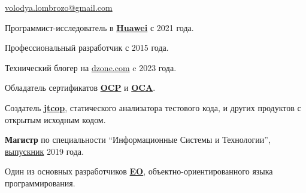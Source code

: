 \documentclass{vl}
\begin{document}
    \vlPrintPhoto{}

    {\bfseries\Large {}}\newline
    \href{mailto:volodya.lombrozo@gmail.com}{volodya.lombrozo@gmail.com}

    \vspace{1em}

    Программист-исследователь в \textbf{\href{https://www.huawei.com}{Huawei}} с 2021 года.

    Профессиональный разработчик с 2015 года.

    Технический блогер на \href{https://dzone.com/users/4993224/volodya-lombrozo.html}{dzone.com} c 2023 года.

    Обладатель сертификатов
    \textbf{\href{https://catalog-education.oracle.com/pls/certview/sharebadge?id=87F6A2FE819A5A5AF4120A05900AB28A461EE9A3EE9FBFA02721FADAEB3BCE19}{OCP}}%
    и
    \textbf{\href{https://www.credly.com/badges/e2d9ddda-20dc-433d-8ab7-18548fd0fd8f/public_url}{OCA}}.

    Создатель \textbf{\href{https://github.com/volodya-lombrozo/jtcop}{jtcop}}, статического анализатора тестового кода,
    и других продуктов с открытым исходным кодом.


    \textbf{Магистр} по специальности ``Информационные Системы и Технологии'',
    \href{https://en.wikipedia.org/wiki/Saint_Petersburg_Electrotechnical_University}{выпускник} 2019 года.

    Один из основных разработчиков \textbf{\href{https://www.eolang.org}{EO}}, объектно-ориентированного языка программирования.
\end{document}

